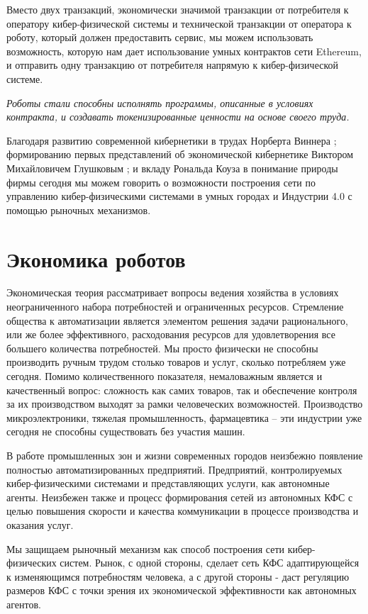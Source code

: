 \documentclass{article}
\begin{document}
Вместо двух транзакций, экономически значимой транзакции от потребителя к оператору кибер-физической системы и технической транзакции от оператора к роботу, который должен предоставить сервис, мы можем использовать возможность, которую нам дает использование умных контрактов сети Ethereum, и отправить одну транзакцию от потребителя напрямую к кибер-физической системе. 

\textit{Роботы стали способны исполнять программы, описанные в условиях контракта, и создавать токенизированные ценности на основе своего труда.}

Благодаря развитию современной кибернетики в трудах Норберта Виннера \cite{Wiener1961CyberneticsEd}; формированию первых представлений об экономической кибернетике Виктором Михайловичем Глушковым \cite{1975.}; и вкладу Рональда Коуза в понимание природы фирмы \cite{Coase1937TheFirm} сегодня мы можем говорить о возможности построения сети по управлению кибер-физическими системами в умных городах и Индустрии 4.0 с помощью рыночных механизмов.

\section{Экономика роботов}

Экономическая теория рассматривает вопросы ведения хозяйства в условиях неограниченного набора потребностей и ограниченных ресурсов. Стремление общества к автоматизации является элементом решения задачи рационального, или же более эффективного, расходования ресурсов для удовлетворения все большего количества потребностей. Мы просто физически не способны производить ручным трудом столько товаров и услуг, сколько потребляем уже сегодня. Помимо количественного показателя, немаловажным является и качественный вопрос: сложность как самих товаров, так и обеспечение контроля за их производством выходят за рамки человеческих возможностей. Производство микроэлектроники, тяжелая промышленность, фармацевтика – эти индустрии уже сегодня не способны существовать без участия машин.

В работе промышленных зон и жизни современных городов неизбежно появление полностью автоматизированных предприятий. Предприятий, контролируемых кибер-физическими системами и представляющих услуги, как автономные агенты. Неизбежен также и процесс формирования сетей из автономных КФС с целью повышения скорости и качества коммуникации в процессе производства и оказания услуг. 

Мы защищаем рыночный механизм как способ построения сети кибер-физических систем. Рынок, с одной стороны, сделает сеть КФС адаптирующейся к изменяющимся потребностям человека, а с другой стороны - даст регуляцию размеров КФС с точки зрения их экономической эффективности как автономных агентов.
\end{document}
